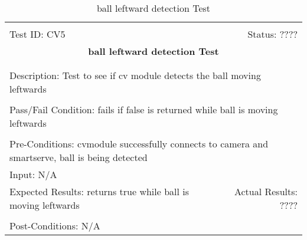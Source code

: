 \documentclass[11pt]{article}
\begin{document}
\begin{center}
\begin{table}[H]
\begin{tabular}{|l r|}\hline&\\[-2mm]
	Test ID: CV5	&Status: ????\\[-3mm]
	\multicolumn{2}{|c|}{\textbf{\large{ball leftward detection Test}}}\\&\\\hline&\\[-3mm]
	\multicolumn{2}{|p{\textwidth}|}{Description: Test to see if cv module detects the ball moving leftwards}\\[1mm]\hline&\\[-3mm]
	\multicolumn{2}{|p{\textwidth}|}{Pass/Fail Condition: fails if false is returned while ball is moving leftwards }\\[1mm]\hline&\\[-3mm]
	\multicolumn{2}{|p{\textwidth}|}{Pre-Conditions: cvmodule successfully connects to camera and smartserve, ball is being detected}\\[4mm]
	\multicolumn{2}{|p{\textwidth}|}{Input: N/A}\\[2mm]\hline
	\multicolumn{1}{|p{0.49\textwidth}}{Expected Results: returns true while ball is moving leftwards}	&\multicolumn{1}{|p{0.45\textwidth}|}{Actual Results: ????}\\\hline&\\[-3mm]
	\multicolumn{2}{|p{\textwidth}|}{Post-Conditions: N/A}\\\hline
\end{tabular}
\caption{ball leftward detection Test}
\end{table}
\end{center}
\end{document}
